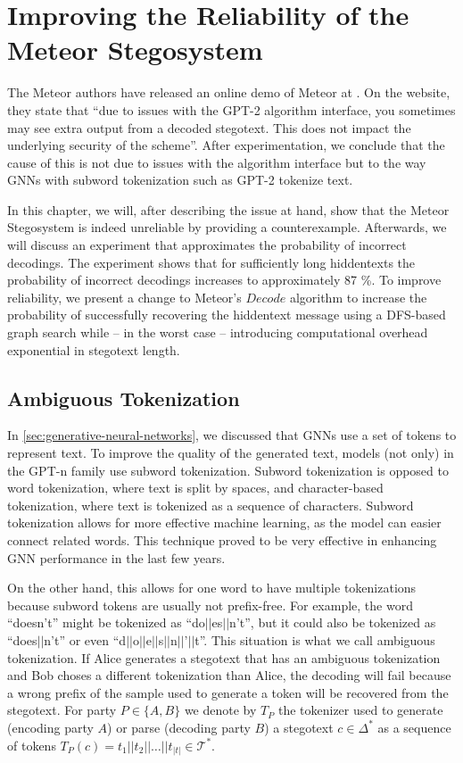 \chapter{Improving the Reliability of the Meteor Stegosystem}
\label{chap:reliability}

The Meteor authors have released an online demo of Meteor at \cite{MeteorDemo2021}.
On the website, they state that ``due to issues with the GPT-2 algorithm interface, you sometimes may see extra output from a decoded stegotext. This does not impact the underlying security of the scheme''.
After experimentation, we conclude that the cause of this is not due to issues with the algorithm interface but to the way GNNs with subword tokenization such as GPT-2 tokenize text.

In this chapter, we will, after describing the issue at hand, show that the Meteor Stegosystem is indeed unreliable by providing a counterexample.
Afterwards, we will discuss an experiment that approximates the probability of incorrect decodings.
The experiment shows that for sufficiently long hiddentexts the probability of incorrect decodings increases to approximately 87 \%.
To improve reliability, we present a change to Meteor's $Decode$ algorithm to increase the probability of successfully recovering the hiddentext message using a DFS-based graph search while -- in the worst case -- introducing computational overhead exponential in stegotext length.

\section{Ambiguous Tokenization}
\label{sec:amb-tok}

In \autoref{sec:generative-neural-networks}, we discussed that GNNs use a set of tokens to represent text.
To improve the quality of the generated text, models (not only) in the GPT-n family use subword tokenization.
Subword tokenization is opposed to word tokenization, where text is split by spaces, and character-based tokenization, where text is tokenized as a sequence of characters.
Subword tokenization allows for more effective machine learning, as the model can easier connect related words.
This technique proved to be very effective in enhancing GNN performance in the last few years.

On the other hand, this allows for one word to have multiple tokenizations because subword tokens are usually not prefix-free.
For example, the word ``doesn't'' might be tokenized as ``do$||$es$||$n't'', but it could also be tokenized as ``does$||$n't'' or even ``d$||$o$||$e$||$s$||$n$||$'$||$t''.
This situation is what we call ambiguous tokenization.
If Alice generates a stegotext that has an ambiguous tokenization and Bob choses a different tokenization than Alice, the decoding will fail because a wrong prefix of the sample used to generate a token will be recovered from the stegotext.
For party $P \in \{A,B\}$ we denote by $T_P$ the tokenizer used to generate (encoding party $A$) or parse (decoding party $B$) a stegotext $c \in \Delta^*$ as a sequence of tokens $T_P(c) = t_1||t_2||\dots||t_{|t|} \in \mathcal{T}^*$.

